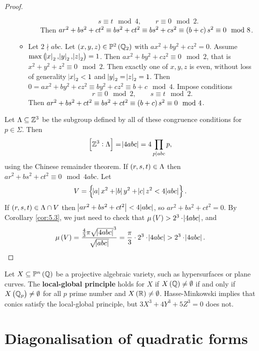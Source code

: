 \begin{proof}
\begin{itemize}
\begin{itemize}
\begin{itemize}
$$ s \equiv t \mod 4, \qquad r \equiv 0 \mod 2. $$
Then $ ar^2 + bs^2 + ct^2 \equiv bs^2 + ct^2 \equiv bs^2 + cs^2 \equiv \br{b + c}s^2 \equiv 0 \mod 8 $.
\end{itemize}
\item Let $ 2 \nmid abc $. Let $ \br{x, y, z} \in \PP^2\br{\QQ_2} $ with $ ax^2 + by^2 + cz^2 = 0 $. Assume $ \max\br{\abs{x}_2, \abs{y}_2, \abs{z}_2} = 1 $. Then $ ax^2 + by^2 + cz^2 \equiv 0 \mod 2 $, that is $ x^2 + y^2 + z^2 \equiv 0 \mod 2 $. Then exactly one of $ x, y, z $ is even, without loss of generality $ \abs{x}_2 < 1 $ and $ \abs{y}_2 = \abs{z}_2 = 1 $. Then $ 0 = ax^2 + by^2 + cz^2 \equiv by^2 + cz^2 \equiv b + c \mod 4 $. Impose conditions
$$ r \equiv 0 \mod 2, \qquad s \equiv t \mod 2. $$
Then $ ar^2 + bs^2 + ct^2 \equiv bs^2 + ct^2 \equiv \br{b + c}s^2 \equiv 0 \mod 4 $.
\end{itemize}
\end{itemize}
Let $ \Lambda \subseteq \mathbb{Z}^3 $ be the subgroup defined by all of these congruence conditions for $ p \in \Sigma $. Then
$$ \sbr{\ZZ^3 : \Lambda} = \abs{4abc} = 4\prod_{p \mid abc} p, $$
using the Chinese remainder theorem. If $ \br{r, s, t} \in \Lambda $ then $ ar^2 + bs^2 + ct^2 \equiv 0 \mod 4abc $. Let
$$ V = \cbr{\abs{a}x^2 + \abs{b}y^2 + \abs{c}z^2 < 4\abs{abc}}. $$
If $ \br{r, s, t} \in \Lambda \cap V $ then $ \abs{ar^2 + bs^2 + ct^2} < 4\abs{abc} $, so $ ar^2 + bs^2 + ct^2 = 0 $. By Corollary \ref{cor:5.3}, we just need to check that $ \mu\br{V} > 2^3 \cdot \abs{4abc} $, and
$$ \mu\br{V} = \dfrac{\tfrac{4}{3}\pi\sqrt{\abs{4abc}}^3}{\sqrt{\abs{abc}}} = \dfrac{\pi}{3} \cdot 2^3 \cdot \abs{4abc} > 2^3 \cdot \abs{4abc}. $$
\end{proof}

Let $ X \subseteq \PP^n\br{\QQ} $ be a projective algebraic variety, such as hypersurfaces or plane curves. The \textbf{local-global principle} holds for $ X $ if $ X\br{\QQ} \ne \emptyset $ if and only if $ X\br{\QQ_p} \ne \emptyset $ for all $ p $ prime number and $ X\br{\RR} \ne \emptyset $. Hasse-Minkowski implies that conics satisfy the local-global principle, but $ 3X^3 + 4Y^3 + 5Z^3 = 0 $ does not.

\pagebreak

\appendix

\section{Diagonalisation of quadratic forms}

